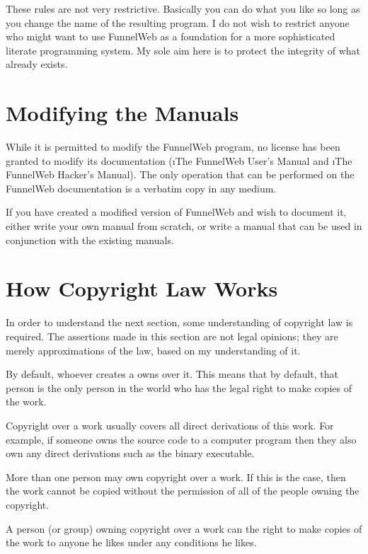 These rules are not very restrictive. Basically you can do what you like
so long as you change the name of the resulting program. I do not wish to
restrict anyone who might want to use FunnelWeb as a foundation for a more
sophisticated literate programming system. My sole aim here is to
protect the integrity of what already exists.

\section{Modifying the Manuals}

While it is permitted to modify the FunnelWeb program, no license has been
granted
to modify its documentation (\i{The FunnelWeb User's Manual} and
\i{The FunnelWeb Hacker's Manual}). The only operation that can be
performed on the FunnelWeb documentation is a verbatim copy in any medium.

If you have created a modified version of FunnelWeb and wish to document it,
either write your own manual from scratch, or write a manual that can be
used in conjunction with the existing manuals.

\section{How Copyright Law Works}

In order to understand the next section, some understanding of copyright
law is required. The assertions made in this section are not legal opinions;
they are merely approximations of the law, based on my understanding of it.

By default, whoever creates a  owns 
over it. This means that by default, that person is the only person in the
world who has the legal right to make copies of the work.

Copyright over a work usually covers all direct derivations of this work.
For example, if someone owns the source code to a computer program
then they also own any direct derivations such as the binary executable.

More than one person may own copyright over a work. If this is the case,
then the work cannot be copied without the permission of all of the people
owning the copyright.

A person (or group) owning copyright over a work
can  the right to make copies
of the work to anyone he likes under any conditions he likes.

